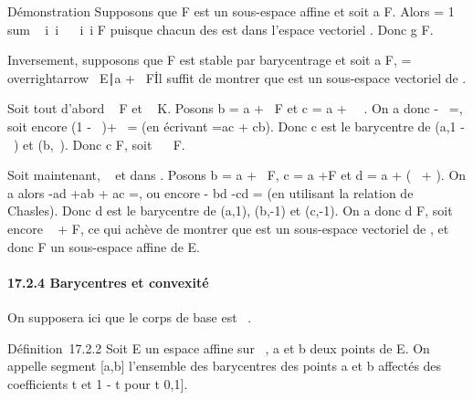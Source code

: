 Démonstration Supposons que F est un sous-espace affine et soit a \in F.
Alors \overrightarrowag = 1 \over
\\sum ~
i\inI\lambda~i \
\sum ~
i\inI\lambda~i\overrightarrowaai
\in\overrightarrow F puisque chacun des
\overrightarrowaai est dans l'espace
vectoriel \overrightarrowF. Donc g \in F.

Inversement, supposons que F est stable par barycentrage et soit a \in F,
\overrightarrowF =
\\overrightarrow\xi~
\in\overrightarrow E∣a
+\overrightarrow \xi~ \in F\. Il suffit
de montrer que \overrightarrowF est un sous-espace
vectoriel de \overrightarrowE.

Soit tout d'abord \overrightarrow\xi~
\in\overrightarrow F et \lambda~ \in K. Posons b = a
+\overrightarrow \xi~ \in F et c = a +
\lambda~\overrightarrow\xi~. On a donc
\overrightarrowac -
\lambda~\overrightarrowab =, soit encore (1 - \lambda~)\overrightarrowac +
\lambda~\overrightarrowbc = (en écrivant \overrightarrowab
=\overrightarrow ac +\overrightarrow
cb). Donc c est le barycentre de (a,1 - \lambda~) et (b,\lambda~). Donc c \in F, soit
\lambda~\overrightarrow\xi~ \in\overrightarrow
F.

Soit maintenant, \overrightarrow\xi~ et
\overrightarrow\eta dans
\overrightarrowF. Posons b = a
+\overrightarrow \xi~ \in F, c = a
+\overrightarrow \eta \in F et d = a +
(\overrightarrow\xi~ +\overrightarrow
\eta). On a alors -\overrightarrow ad
+\overrightarrow ab +\overrightarrow
ac =, ou encore
\overrightarrowad -\overrightarrow
bd -\overrightarrow cd
= (en utilisant la relation de
Chasles). Donc d est le barycentre de (a,1), (b,-1) et (c,-1). On a donc
d \in F, soit encore \overrightarrow\xi~
+\overrightarrow \eta \in{}, ce qui achève de montrer que \overrightarrowF
est un sous-espace vectoriel de \overrightarrowE, et
donc F un sous-espace affine de E.

\paragraph{17.2.4 Barycentres et convexité}

On supposera ici que le corps de base est ~.

Définition~17.2.2 Soit E un espace affine sur ~, a et b deux points de
E. On appelle segment {[}a,b{]} l'ensemble des barycentres des points a
et b affectés des coefficients t et 1 - t pour t \in {[}0,1{]}.

